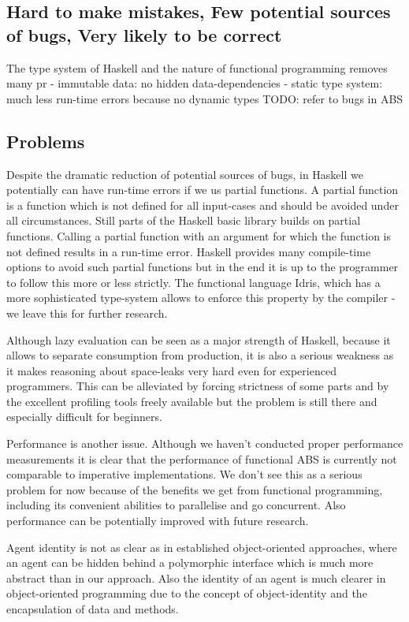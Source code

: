 \subsection{Hard to make mistakes, Few potential sources of bugs, Very likely to be correct}
The type system of Haskell and the nature of functional programming removes many pr
- immutable data: no hidden data-dependencies
- static type system: much less run-time errors because no dynamic types
TODO: refer to bugs in ABS

\subsection{Problems}
Despite the dramatic reduction of potential sources of bugs, in Haskell we potentially can have run-time errors if we us partial functions. A partial function is a function which is not defined for all input-cases and should be avoided under all circumstances. Still parts of the Haskell basic library builds on partial functions. Calling a partial function with an argument for which the function is not defined results in a run-time error. Haskell provides many compile-time options to avoid such partial functions but in the end it is up to the programmer to follow this more or less strictly. The functional language Idris, which has a more sophisticated type-system allows to enforce this property by the compiler - we leave this for further research.

Although lazy evaluation can be seen as a major strength of Haskell, because it allows to separate consumption from production, it is also a serious weakness as it makes reasoning about space-leaks very hard even for experienced programmers. This can be alleviated by forcing strictness of some parts and by the excellent profiling tools freely available but the problem is still there and especially difficult for beginners.

Performance is another issue. Although we haven't conducted proper performance measurements it is clear that the performance of functional ABS is currently not comparable to imperative implementations. We don't see this as a serious problem for now because of the benefits we get from functional programming, including its convenient abilities to parallelise and go concurrent. Also performance can be potentially improved with future research.

Agent identity is not as clear as in established object-oriented approaches, where an agent can be hidden behind a polymorphic interface which is much more abstract than in our approach. Also the identity of an agent is much clearer in object-oriented programming due to the concept of object-identity and the encapsulation of data and methods.


